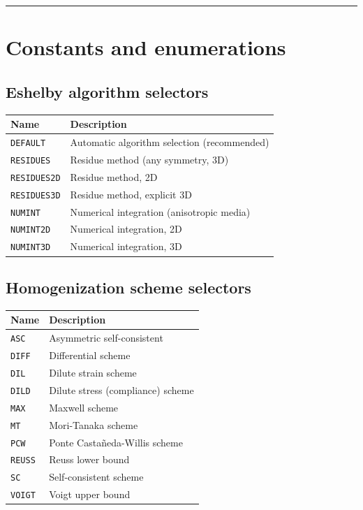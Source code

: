 \documentclass[
  a4paper,
  numbers=noendperiod,
  DIV=12]{scrreprt}
\newcounter{none} %
\begin{document}
\begin{center}\rule{0.5\linewidth}{0.5pt}\end{center}

\section{Constants and enumerations}\label{sec-api-constants}

\subsection{Eshelby algorithm
selectors}\label{eshelby-algorithm-selectors}

{\def\LTcaptype{none} %
\begin{longtable}[]{@{}ll@{}}
\toprule\noalign{}
Name & Description \\
\midrule\noalign{}
\endhead
\bottomrule\noalign{}
\endlastfoot
\texttt{DEFAULT} & Automatic algorithm selection (recommended) \\
\texttt{RESIDUES} & Residue method (any symmetry, 3D) \\
\texttt{RESIDUES2D} & Residue method, 2D \\
\texttt{RESIDUES3D} & Residue method, explicit 3D \\
\texttt{NUMINT} & Numerical integration (anisotropic media) \\
\texttt{NUMINT2D} & Numerical integration, 2D \\
\texttt{NUMINT3D} & Numerical integration, 3D \\
\end{longtable}
}

\subsection{Homogenization scheme
selectors}\label{homogenization-scheme-selectors}

{\def\LTcaptype{none} %
\begin{longtable}[]{@{}ll@{}}
\toprule\noalign{}
Name & Description \\
\midrule\noalign{}
\endhead
\bottomrule\noalign{}
\endlastfoot
\texttt{ASC} & Asymmetric self-consistent \\
\texttt{DIFF} & Differential scheme \\
\texttt{DIL} & Dilute strain scheme \\
\texttt{DILD} & Dilute stress (compliance) scheme \\
\texttt{MAX} & Maxwell scheme \\
\texttt{MT} & Mori-Tanaka scheme \\
\texttt{PCW} & Ponte Castañeda-Willis scheme \\
\texttt{REUSS} & Reuss lower bound \\
\texttt{SC} & Self-consistent scheme \\
\texttt{VOIGT} & Voigt upper bound \\
\end{longtable}
}
\end{document}
